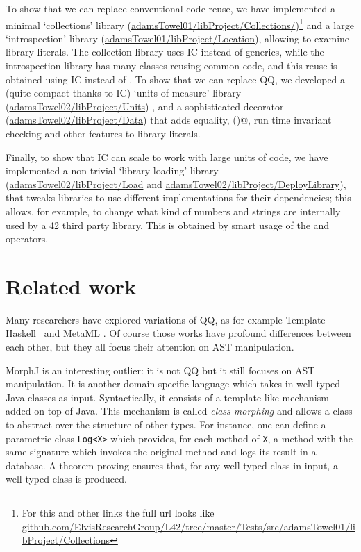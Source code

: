 To show that we can replace conventional code reuse,
we have implemented a minimal `collections' library
(\url{adamsTowel01/libProject/Collections/})\footnote{
For this and other links the full url looks like \url{github.com/ElvisResearchGroup/L42/tree/master/Tests/src/adamsTowel01/libProject/Collections}
}
 and a large `introspection' library
(\url{adamsTowel01/libProject/Location}), 
allowing to examine library literals.
The collection library uses IC instead of generics,
while the introspection library has many classes reusing common code, and this reuse is obtained using IC instead of
\Q@extends@.
To show that we can replace QQ, we developed
a (quite compact thanks to IC) `units of measure' library
(\url{adamsTowel02/libProject/Units})
, and a sophisticated \Q@Data@ decorator
(\url{adamsTowel02/libProject/Data})
that adds equality, \Q@toS()@, run time invariant checking and other features to library literals.

 Finally, to show that IC can scale to work with large units of code,
we have implemented a non-trivial `library loading' library
(\url{adamsTowel02/libProject/Load} and
\url{adamsTowel02/libProject/DeployLibrary}), that  tweaks libraries to use different implementations for their dependencies;
this allows, for example, to change what kind of numbers and 
strings are internally used by a 42 third party library.
This is obtained by smart usage of the \Q@Redirect@ and \Q@Rename@ operators.


\section{Related work}

Many researchers have explored variations of QQ, as for example
Template Haskell~\cite{sheard2002template} and MetaML \cite{moggi1999idealized}.
Of course those works have profound differences between each other, but they all
focus their attention on AST manipulation.

MorphJ \cite{huang2008expressive} is an interesting outlier: it is not QQ but 
it still focuses on AST manipulation. It is another domain-specific language which takes in well-typed Java classes as input. Syntactically, it consists of a template-like mechanism added on top of Java. This mechanism is called  
\emph{class morphing} and allows a class to abstract over the structure of other types. For instance, one can define a parametric class \lstinline{Log<X>} which provides, for each method of \lstinline{X}, a method with the same signature which invokes the original method and logs its result in a database.
A theorem proving ensures that, for any well-typed class in input, a well-typed class is produced.

